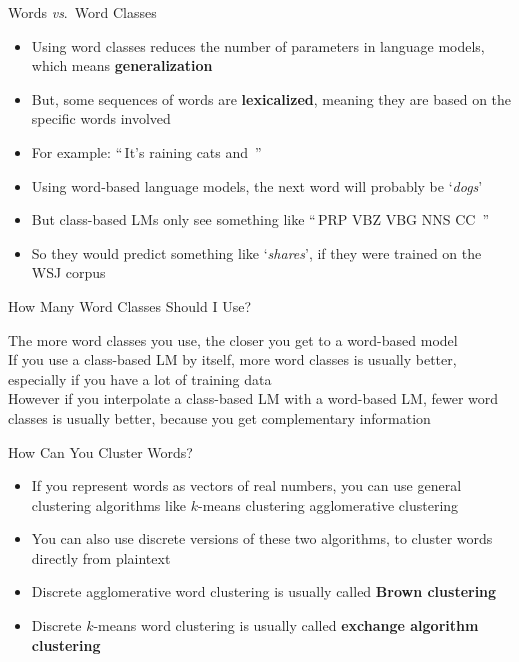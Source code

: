 \documentclass[xcolor=pdftex,x11names,table,hyperref]{beamer}
\begin{document}
\begin{frame}{Words \textit{vs}.\ Word Classes}
\begin{itemize}
	\item Using word classes reduces the number of parameters in language models, which means \textbf{generalization}
	\pause
	\item But, some sequences of words are \textbf{lexicalized}, meaning they are based on the specific words involved
	\pause
	\item For example:   ``\,It's raining cats and \underline{\hspace{2em}}\,''
	\pause
	\item Using word-based language models, the next word will probably be `\textit{dogs}'
	\pause
	\item But class-based LMs only see something like ``\,PRP VBZ VBG NNS CC \underline{\hspace{2em}}\,''
	\item So they would predict something like `\textit{shares}', if they were trained on the WSJ corpus
\end{itemize}
\end{frame}

\begin{frame}{How Many Word Classes Should I Use?}
	\begin{large}
	The more word classes you use, the closer you get to a word-based model \\[1.0em]

	\pause
	If you use a class-based LM by itself, more word classes is usually better, especially if you have a lot of training data \\[1.0em]

	\pause
	However if you interpolate a class-based LM with a word-based LM, fewer word classes is usually better, because you get complementary information
	\end{large}
\end{frame}

\begin{frame}{How Can You Cluster Words?}
\begin{itemize}
	\item If you represent words as vectors of real numbers, you can use general clustering algorithms like $k$-means clustering agglomerative clustering
	\pause
	\item You can also use discrete versions of these two algorithms, to cluster words directly from plaintext
	\pause
	\item Discrete agglomerative word clustering is usually called \textbf{Brown clustering}
	\item Discrete $k$-means word clustering is usually called \textbf{exchange algorithm clustering}
\end{itemize}
\end{frame}
\end{document}
